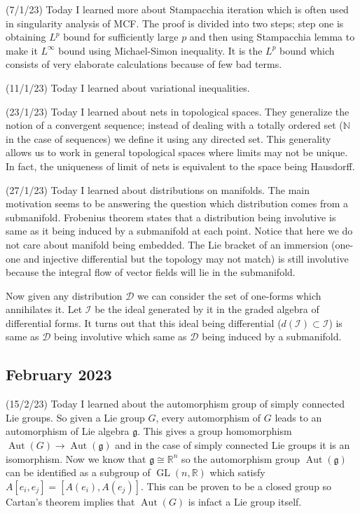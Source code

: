 \documentclass[12pt,a4paper]{article}
\newcommand{\R}{\mathbb{R}}
\newcommand{\fg}{\mathfrak{g}}
\begin{document}
(7/1/23) Today I learned more about Stampacchia iteration which is often used in singularity analysis of MCF. The proof is divided into two steps; step one is obtaining $ L^{p} $ bound for sufficiently large $ p $ and then using Stampacchia lemma to make it $ L^{\infty} $ bound using Michael-Simon inequality. It is the $ L^{p} $ bound which consists of very elaborate calculations because of few bad terms.

(11/1/23) Today I learned about variational inequalities. 

(23/1/23) Today I learned about nets in topological spaces. They generalize the notion of a convergent sequence; instead of dealing with a totally ordered set ($\mathbb{N} $ in the case of sequences) we define it using any directed set. This generality allows us to work in general topological spaces where limits may not be unique. In fact, the uniqueness of limit of nets is equivalent to the space being Hausdorff.

(27/1/23) Today I learned about distributions on manifolds. The main motivation seems to be answering the question which distribution comes from a submanifold. Frobenius theorem states that a distribution being involutive is same as it being induced by a submanifold at each point. Notice that here we do not care about manifold being embedded. The Lie bracket of an immersion (one-one and injective differential but the topology may not match) is still involutive because the integral flow of vector fields will lie in the submanifold. 

Now given any distribution $ \mathscr{D} $ we can consider the set of one-forms which annihilates it. Let $ \mathscr{I} $ be the ideal generated by it in the graded algebra of differential forms. It turns out that this ideal being differential ($ d( \mathscr{I}) \subset \mathscr{I} $) is same as $ \mathscr{D} $ being involutive which same as $ \mathscr{D} $ being induced by a submanifold.


\subsection*{February 2023}


\quad (15/2/23) Today I learned about the automorphism group of simply connected Lie groups. So given a Lie group $ G $, every automorphism of $ G $ leads to an automorphism of Lie algebra $ \fg $. This gives a group homomorphism $ \operatorname{Aut}(G) \to \operatorname{Aut}(\fg) $ and in the case of simply connected Lie groups it is an isomorphism. Now we know that $ \fg  \cong \R^{n}$ so the automorphism group $ \operatorname{Aut}(\fg) $  can be identified as a subgroup of $ \operatorname{GL}(n,\R) $ which satisfy $ A[e_{i},e_{j}] = [A(e_{i}),A(e_{j})] $. This can be proven to be a closed group so Cartan's theorem implies that $ \operatorname{Aut}(G) $ is infact a Lie group itself.
\end{document}
